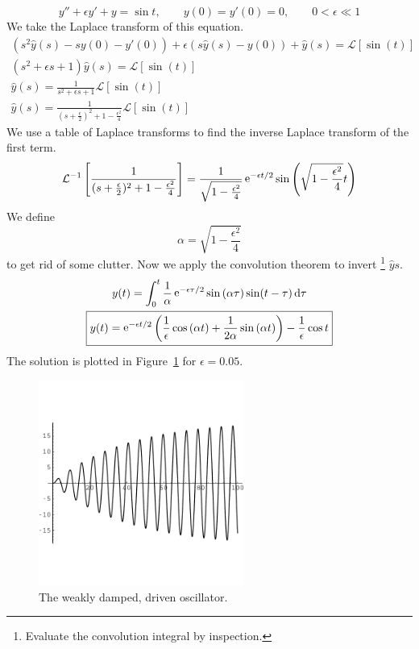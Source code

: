 {%
\begin{Solution}
  \label{solution y''+ey'+y=sin t}
  \[ 
  y'' + \epsilon y' + y = \sin t, \qquad y(0) = y'(0) = 0, \qquad 0 < \epsilon \ll 1
  \]
  We take the Laplace transform of this equation.
  \begin{gather*}
    (s^2 \hat{y}(s) - s y(0) - y'(0)) + \epsilon (s \hat{y}(s) - y(0)) + \hat{y}(s)
    = \mathcal{L}[ \sin(t) ] \\
    (s^2 + \epsilon s + 1)\hat{y}(s) = \mathcal{L}[ \sin(t) ] \\
    \hat{y}(s) = \frac{1}{s^2 + \epsilon s + 1} \mathcal{L}[ \sin(t) ] \\
    \hat{y}(s) = \frac{1}{ (s+ \frac{\epsilon}{2})^2 + 1 - \frac{\epsilon^2}{4} } 
    \mathcal{L}[ \sin(t) ]
  \end{gather*}
  We use a table of Laplace transforms to find the inverse Laplace transform
  of the first term.
  \[
  \mathcal{L}^{-1} \left[ \frac{1}{(s+ \frac{\epsilon}{2})^2 + 1 - \frac{\epsilon^2}{4}} \right]
  = \frac{1}{\sqrt{1 - \frac{\epsilon^2}{4}}} \mathop{\mathrm{e}}\nolimits^{-\epsilon t / 2}
  \sin \left( \sqrt{1 - \frac{\epsilon^2}{4}} t \right)
  \]
  We define
  \[
  \alpha = \sqrt{1 - \frac{\epsilon^2}{4}}
  \]
  to get rid of some clutter.  Now we apply the convolution theorem to invert
  \footnote{Evaluate the convolution integral by inspection.}
  $\hat{y}{s}$.
  \begin{gather*}
    y(t) = \int_0^t \frac{1}{\alpha} \mathop{\mathrm{e}}\nolimits^{-\epsilon \tau / 2} \sin \left( \alpha \tau \right) \sin (t - \tau) \,\mathrm{d} \tau \\
    \boxed{
      y(t) =  \mathop{\mathrm{e}}\nolimits^{-\epsilon t/2} \left( \frac{1}{\epsilon} \cos \left( \alpha t
        \right) + \frac{1}{2 \alpha} \sin \left( \alpha t
        \right) \right) - \frac{1}{\epsilon} \cos t
      }
  \end{gather*}
  The solution is plotted in Figure~\ref{damped_driven} for $\epsilon = 0.05$.

  \begin{figure}[h!]
    \begin{center}
      \includegraphics[width=0.6\textwidth]{ode/laplace/dampdriv}
    \end{center}
    \caption{The weakly damped, driven oscillator.}
    \label{damped_driven}
  \end{figure}


\end{Solution}}
